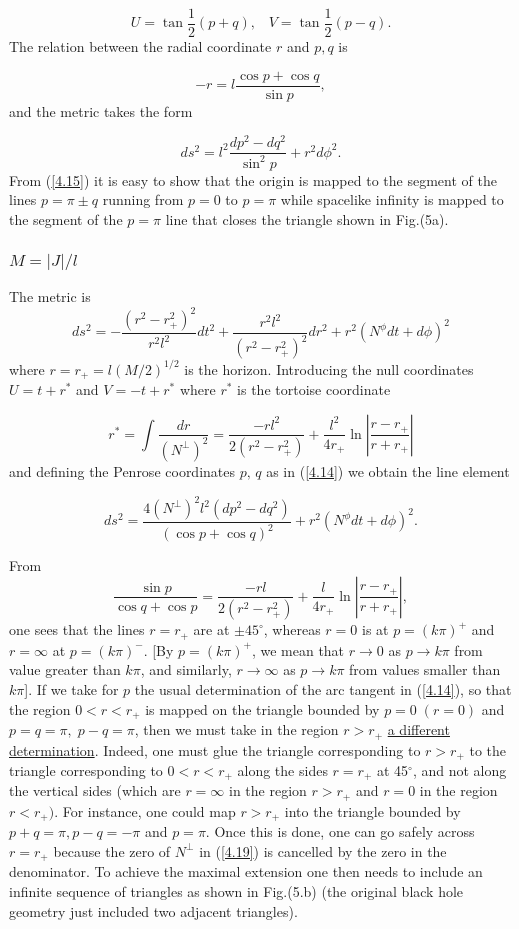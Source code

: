 \documentclass[12pt]{article}
\newcounter{c1} \newcounter{c2}
\newcommand{\bb}{\begin{equation}}
\newcommand{\ee}{\end{equation}}
\newcommand{\m}{\mbox{$\frac{1}{2}$}}
\begin{document}
\bb
U=\tan\m(p+q), \;\;\; V=\tan\m(p-q).
\label{4.14}
\ee
%
The relation between the radial coordinate $r$ and $p,q$ is

\bb
-r=l\frac{\cos p + \cos q}{\sin p},
\label{4.15}
\ee
%
and the metric takes the form

\bb
ds^2 = l^2\frac{dp^2 - dq^2}{\sin^2 p} + r^2 d\phi^2.
\label{4.16}
\ee
%
 From (\ref{4.15}) it is easy to show that the origin is mapped
to the segment of the lines $p=\pi \pm q$ running from $p=0$ to
$p=\pi$ while spacelike infinity is mapped to the segment of the
$p=\pi$ line that closes the triangle shown in Fig.(5a).



\subsubsection{{\bf $M=|J|/l$}}

The metric is
\bb
ds^2 = -\frac{(r^2-r_+^2)^2}{r^2 l^2}dt^2 +
\frac{r^2 l^2}{(r^2-r_+^2)^2}dr^2 + r^2(N^{\phi}dt + d\phi)^2
\label{4.17}
\ee
%
where $r=r_+=l (M/2)^{1/2}$ is the horizon. Introducing the
null coordinates $U=t+r^{*}$ and $V=-t+r^{*}$ where $r^{*}$ is
the tortoise coordinate

\bb
r^{*}=\int \frac{dr}{(N^{\perp})^2}= \frac{-rl^2}{2(r^2-r_+^2)} +
\frac{l^2}{4r_+}\ln\left|\frac{r-r_+}{r+r_+} \right|
\label{4.18}
\ee
%
and defining the Penrose coordinates $p,\, q$ as in (\ref{4.14}) we
obtain the line element

\bb
ds^2 = \frac{4(N^{\perp})^2 l^2(dp^2-dq^2)}{(\cos p + \cos q)^2}
+ r^2 (N^{\phi} dt + d\phi)^2.
\label{4.19}
\ee

{}From
\bb
\frac{\sin p}{\cos q + \cos p} =  \frac{-rl}{2(r^2-r_+^2)} +
\frac{l}{4r_+}\ln\left|\frac{r-r_+}{r+r_+} \right|,
\label{4.20}
\ee
%
one sees that the lines $r=r_{+}$ are at $\pm
45^{\circ}$, whereas $r=0$ is at $p=(k \pi)^{+}$ and
$r=\infty$ at $p=(k \pi)^{-}$. [By $p = (k \pi)^{+}$, we
mean that $r \rightarrow 0$ as $p \rightarrow k \pi$ from
value greater than $k \pi$, and similarly, $r \rightarrow
\infty$ as $p \rightarrow k \pi$ from
values smaller than $k \pi$].  If we take for $p$ the usual
determination of the arc tangent in (\ref{4.14}), so that the
region $0<r<r_{+}$ is mapped on the triangle bounded by $p=0 \;
(r=0)$ and $p = q = \pi, \; p-q = \pi$, then we must take in the
region $r>r_{+}$ \underline{a different determination}. Indeed,
one must glue the triangle corresponding to $r > r_{+}$ to the
triangle corresponding to $0<r<r_{+}$ along the sides $r=r_{+}$
at 45$^{\circ}$, and not along the vertical sides (which are $r=
\infty$ in the region $r>r_+$ and $r=0$ in the region $r<r_{+})$. For
instance, one could map $r>r_{+}$ into the triangle bounded by
$p+q=\pi, p-q= - \pi$ and $p=\pi$. Once this is done, one can go
safely across $r=r_{+}$ because the zero of $N^{\perp}$ in
(\ref{4.19}) is cancelled by the zero in the denominator. To
achieve the maximal extension one then needs to include an
infinite sequence of triangles as shown in Fig.(5.b) (the
original black hole geometry just included two adjacent
triangles).
\end{document}
